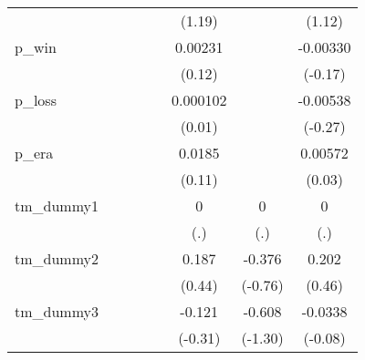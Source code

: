 {\begin{tabular}{l*{7}{c}}
            &                     &                     &                     &                     &      (1.19)         &                     &      (1.12)         \\
[1em]
p\_win       &                     &                     &                     &                     &     0.00231         &                     &    -0.00330         \\
            &                     &                     &                     &                     &      (0.12)         &                     &     (-0.17)         \\
[1em]
p\_loss      &                     &                     &                     &                     &    0.000102         &                     &    -0.00538         \\
            &                     &                     &                     &                     &      (0.01)         &                     &     (-0.27)         \\
[1em]
p\_era       &                     &                     &                     &                     &      0.0185         &                     &     0.00572         \\
            &                     &                     &                     &                     &      (0.11)         &                     &      (0.03)         \\
[1em]
tm\_dummy1   &                     &                     &                     &                     &           0         &           0         &           0         \\
            &                     &                     &                     &                     &         (.)         &         (.)         &         (.)         \\
[1em]
tm\_dummy2   &                     &                     &                     &                     &       0.187         &      -0.376         &       0.202         \\
            &                     &                     &                     &                     &      (0.44)         &     (-0.76)         &      (0.46)         \\
[1em]
tm\_dummy3   &                     &                     &                     &                     &      -0.121         &      -0.608         &     -0.0338         \\
            &                     &                     &                     &                     &     (-0.31)         &     (-1.30)         &     (-0.08)         \\

\end{tabular}}
